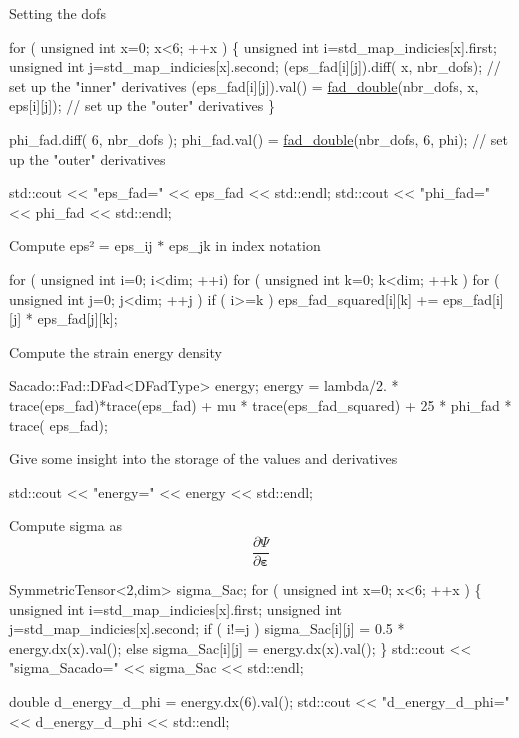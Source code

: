  Setting the dofs 
\begin{DoxyCode}
\textcolor{keywordflow}{for} ( \textcolor{keywordtype}{unsigned} \textcolor{keywordtype}{int} x=0; x<6; ++x )
\{
   \textcolor{keywordtype}{unsigned} \textcolor{keywordtype}{int} i=std\_map\_indicies[x].first;
   \textcolor{keywordtype}{unsigned} \textcolor{keywordtype}{int} j=std\_map\_indicies[x].second;
   (eps\_fad[i][j]).diff( x, nbr\_dofs); \textcolor{comment}{// set up the "inner" derivatives}
   (eps\_fad[i][j]).val() = \hyperlink{Sacado__example_8cc_a868b94676739e612d9c95940e70892a9}{fad\_double}(nbr\_dofs, x, eps[i][j]); \textcolor{comment}{// set up the "outer" derivatives}
\}

phi\_fad.diff( 6, nbr\_dofs );
phi\_fad.val() = \hyperlink{Sacado__example_8cc_a868b94676739e612d9c95940e70892a9}{fad\_double}(nbr\_dofs, 6, phi); \textcolor{comment}{// set up the "outer" derivatives}

std::cout << \textcolor{stringliteral}{"eps\_fad="} << eps\_fad << std::endl;
std::cout << \textcolor{stringliteral}{"phi\_fad="} << phi\_fad << std::endl;
\end{DoxyCode}
 Compute eps² = eps\+\_\+ij $\ast$ eps\+\_\+jk in index notation 
\begin{DoxyCode}
\textcolor{keywordflow}{for} ( \textcolor{keywordtype}{unsigned} \textcolor{keywordtype}{int} i=0; i<dim; ++i)
   \textcolor{keywordflow}{for} ( \textcolor{keywordtype}{unsigned} \textcolor{keywordtype}{int} k=0; k<dim; ++k )
       \textcolor{keywordflow}{for} ( \textcolor{keywordtype}{unsigned} \textcolor{keywordtype}{int} j=0; j<dim; ++j )
           \textcolor{keywordflow}{if} ( i>=k )
               eps\_fad\_squared[i][k] += eps\_fad[i][j] * eps\_fad[j][k];
\end{DoxyCode}
 Compute the strain energy density 
\begin{DoxyCode}
Sacado::Fad::DFad<DFadType> energy;
energy = lambda/2. * trace(eps\_fad)*trace(eps\_fad) + mu * trace(eps\_fad\_squared) + 25 * phi\_fad * trace(
      eps\_fad);
\end{DoxyCode}
 Give some insight into the storage of the values and derivatives 
\begin{DoxyCode}
std::cout << \textcolor{stringliteral}{"energy="} << energy << std::endl;
\end{DoxyCode}
 Compute sigma as \[ \frac{\partial \Psi}{\partial \boldsymbol{\varepsilon}} \] 
\begin{DoxyCode}
SymmetricTensor<2,dim> sigma\_Sac;
\textcolor{keywordflow}{for} ( \textcolor{keywordtype}{unsigned} \textcolor{keywordtype}{int} x=0; x<6; ++x )
\{
   \textcolor{keywordtype}{unsigned} \textcolor{keywordtype}{int} i=std\_map\_indicies[x].first;
   \textcolor{keywordtype}{unsigned} \textcolor{keywordtype}{int} j=std\_map\_indicies[x].second;
   \textcolor{keywordflow}{if} ( i!=j )
       sigma\_Sac[i][j] = 0.5 * energy.dx(x).val();
   \textcolor{keywordflow}{else}
       sigma\_Sac[i][j] = energy.dx(x).val();
\}
std::cout << \textcolor{stringliteral}{"sigma\_Sacado="} << sigma\_Sac << std::endl;

\textcolor{keywordtype}{double} d\_energy\_d\_phi = energy.dx(6).val();
std::cout << \textcolor{stringliteral}{"d\_energy\_d\_phi="} << d\_energy\_d\_phi << std::endl;
\end{DoxyCode}
